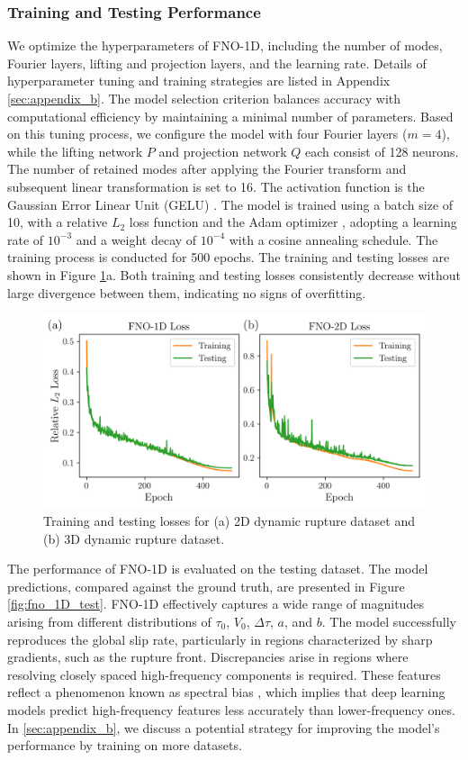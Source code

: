 \documentclass[draft]{agujournal2019}
\begin{document}
\subsubsection{Training and Testing Performance}
\label{sec:FNO-1D_training}

We optimize the hyperparameters of FNO-1D, including the number of modes, Fourier layers, lifting and projection layers, and the learning rate. Details of hyperparameter tuning and training strategies are listed in Appendix \ref{sec:appendix_b}. The model selection criterion balances accuracy with computational efficiency by maintaining a minimal number of parameters. Based on this tuning process, we configure the model with four Fourier layers (\(m = 4\)), while the lifting network \(P\) and projection network \(Q\) each consist of 128 neurons. The number of retained modes after applying the Fourier transform and subsequent linear transformation is set to 16. The activation function is the Gaussian Error Linear Unit (GELU) \cite{hendrycks2016gaussian}. The model is trained using a batch size of 10, with a relative \(L_2\) loss function and the Adam optimizer \cite{kingma2014adam}, adopting a learning rate of \(10^{-3}\) and a weight decay of \(10^{-4}\) with a cosine annealing schedule. The training process is conducted for 500 epochs. The training and testing losses are shown in Figure \ref{fig:loss}a. Both training and testing losses consistently decrease without large divergence between them, indicating no signs of overfitting.

\begin{figure}
\centering
\includegraphics[width=0.7\linewidth]{loss.png}
\caption{\label{fig:loss}Training and testing losses for (a) 2D dynamic rupture dataset and (b) 3D dynamic rupture dataset.
}
\end{figure}

The performance of FNO-1D is evaluated on the testing dataset. The model predictions, compared against the ground truth, are presented in Figure \ref{fig:fno_1D_test}. FNO-1D effectively captures a wide range of magnitudes arising from different distributions of \(\tau_{0}\), \(V_{0}\), \(\Delta \tau\), \(a\), and \(b\). The model successfully reproduces the global slip rate, particularly in regions characterized by sharp gradients, such as the rupture front. Discrepancies arise in regions where resolving closely spaced high-frequency components is required. These features reflect a phenomenon known as spectral bias \cite{rahaman2019spectral, cao2019towards, kong2025reducing}, which implies that deep learning models predict high-frequency features less accurately than lower-frequency ones. In \ref{sec:appendix_b}, we discuss a potential strategy for improving the model's performance by training on more datasets.
\end{document}
